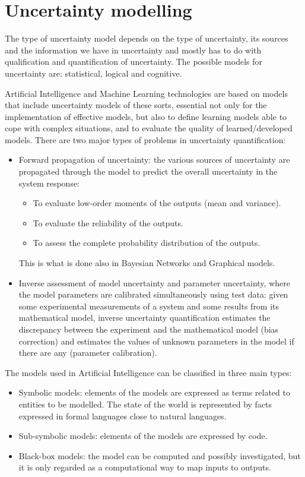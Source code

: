 \documentclass[12pt, a4paper]{report}
\theoremstyle{remark}
\begin{document}
    \section{Uncertainty modelling}
    The type of uncertainty model depends on the type of uncertainty, its sources and the information we have in uncertainty and mostly
    has to do with qualification and quantification of uncertainty. The possible models for uncertainty are: statistical, logical and
    cognitive.

    Artificial Intelligence and Machine Learning technologies are based on models that include uncertainty models of these sorts, essential
    not only for the implementation of effective models, but also to define learning models able to cope with complex situations, and 
    to evaluate the quality of learned/developed models. 
    There are two major types of problems in uncertainty quantification: 
    \begin{itemize}
        \item Forward propagation of uncertainty: the various sources of uncertainty are propagated through the model to predict the overall
            uncertainty in the system response:
            \begin{itemize}
                \item To evaluate low-order moments of the outputs (mean and variance).
                \item To evaluate the reliability of the outputs.
                \item To assess the complete probability distribution of the outputs. 
            \end{itemize}
            This is what is done also in Bayesian Networks and Graphical models. 
        \item Inverse assessment of model uncertainty and parameter uncertainty, where the model parameters are calibrated simultaneously
            using test data: given some experimental measurements of a system and some results from its mathematical model, inverse 
            uncertainty quantification estimates the discrepancy between the experiment and the mathematical model (bias correction) and
            estimates the values of unknown parameters in the model if there are any (parameter calibration).
    \end{itemize}
    The models used in Artificial Intelligence can be classified in three main types: 
    \begin{itemize}
        \item Symbolic models: elements of the models are expressed as terms related to entities to be modelled. The state of the world is
            represented by facts expressed in formal languages close to natural languages.
        \item Sub-symbolic models: elements of the models are expressed by code. 
        \item Black-box models: the model can be computed and possibly investigated, but it is only regarded as a computational way to map
            inputs to outputs. 
    \end{itemize}
\end{document}
